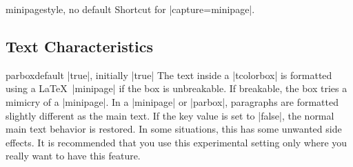 \begin{docTcbKey}{minipage}{}{style, no default}
  Shortcut for |capture=minipage|.
\end{docTcbKey}


\clearpage
\subsection{Text Characteristics}
\begin{docTcbKey}[][doc updated=2015-10-14]{parbox}{}{default |true|, initially |true|}
  The text inside a |tcolorbox| is formatted using a \LaTeX\ |minipage|
  if the box is unbreakable. If breakable, the box tries a mimicry of
  a |minipage|. In a |minipage| or |parbox|, paragraphs are formatted slightly different
  as the main text. If the key value is set to |false|, the normal main text
  behavior is restored. In some situations, this has some unwanted side
  effects. It is recommended that you use this experimental setting only
  where you really want to have this feature.
\end{docTcbKey}

\begin{dispListing}

\begin{tcolorbox}[parbox,adjusted title={parbox=true (normal)}]
  \lipsum[1-2]
\end{tcolorbox}\hfill%
\begin{tcolorbox}[parbox=false,adjusted title={parbox=false}]
  \lipsum[1-2]
\end{tcolorbox}%
\end{dispListing}
{\tcbusetemp}


